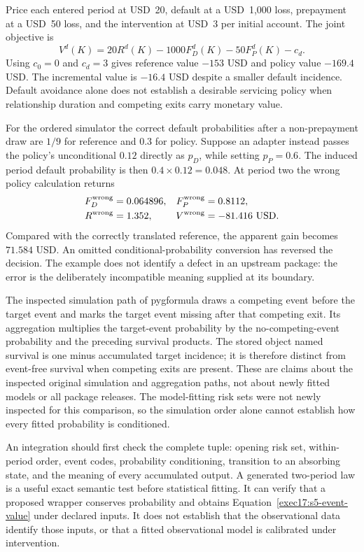 Price each entered period at USD~20, default at a USD~1,000 loss, prepayment
at a USD~50 loss, and the intervention at USD~3 per initial account. The
joint objective is
\begin{equation}
 V^d(K)=20R^d(K)-1000F_D^d(K)-50F_P^d(K)-c_d.
 \label{exec17:s5-event-value}
\end{equation}
Using $c_0=0$ and $c_d=3$ gives reference value $-153$ USD and policy value
$-169.4$ USD. The incremental value is $-16.4$ USD despite a smaller default
incidence. Default avoidance alone does not establish a desirable servicing
policy when relationship duration and competing exits carry monetary value.

For the ordered simulator the correct default probabilities after a
non-prepayment draw are $1/9$ for reference and $0.3$ for policy. Suppose an
adapter instead passes the policy's unconditional $0.12$ directly as $p_D$,
while setting $p_P=0.6$. The induced period default probability is then
$0.4\times0.12=0.048$. At period two the wrong policy calculation returns
\begin{align}
 F_D^{\rm wrong}&=0.064896,&F_P^{\rm wrong}&=0.8112,\notag\\
 R^{\rm wrong}&=1.352,&V^{\rm wrong}&=-81.416\ \mathrm{USD}.
 \label{exec17:s5-ordered-error}
\end{align}
Compared with the correctly translated reference, the apparent gain becomes
$71.584$ USD. An omitted conditional-probability conversion has reversed the
decision. The example does not identify a defect in an upstream package: the
error is the deliberately incompatible meaning supplied at its boundary.
\citep{exec17_s5_math}

The inspected simulation path of pygformula draws a competing event before
the target event and marks the target event missing after that competing
exit. Its aggregation multiplies the target-event probability by the
no-competing-event probability and the preceding survival products. The
stored object named survival is one minus accumulated target incidence;
it is therefore distinct from event-free survival when competing exits are
present. These are claims about the inspected original simulation and
aggregation paths, not about newly fitted models or all package releases.
The model-fitting risk sets were not newly inspected for this comparison,
so the simulation order alone cannot establish how every fitted probability
is conditioned.~\citep{v13_sw_pygformula,exec17_s5_paths}

An integration should first check the complete tuple: opening risk set,
within-period order, event codes, probability conditioning, transition to an
absorbing state, and the meaning of every accumulated output. A generated
two-period law is a useful exact semantic test before statistical fitting.
It can verify that a proposed wrapper conserves probability and obtains
Equation~\eqref{exec17:s5-event-value} under declared inputs. It does not
establish that the observational data identify those inputs, or that a
fitted observational model is calibrated under intervention.

